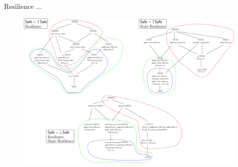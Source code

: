\documentclass{beamer}
\begin{document}
  \begin{frame}{Resilience $\ldots$}
  
  
   \begin{center}
 	\begin{figure}
 	\vspace{-0.25cm}
\includegraphics[width=1.00\textwidth]{All_results}
	\end{figure}
\end{center}  
    
    

  \end{frame}
\end{document}
